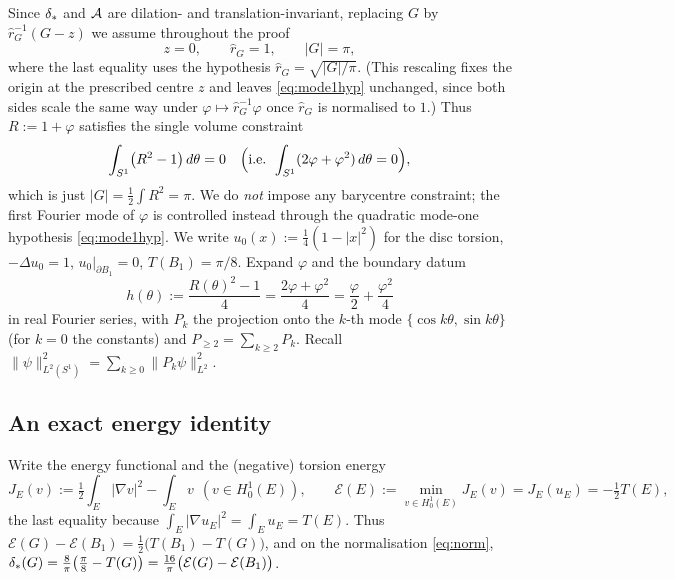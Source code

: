 Since $\delta_{*}$ and $\mathcal{A}$ are dilation- and translation-invariant, replacing
$G$ by $\hat r_G^{-1}(G-z)$ we assume throughout the proof
\begin{equation}\label{eq:norm}
   z=0,\qquad \hat r_G=1,\qquad |G|=\pi,
\end{equation}
where the last equality uses the hypothesis
$\hat r_G=\sqrt{|G|/\pi}$. (This rescaling fixes the origin at the prescribed
centre $z$ and leaves \eqref{eq:mode1hyp} unchanged, since both sides scale
the same way under $\varphi\mapsto\hat r_G^{-1}\varphi$ once $\hat r_G$ is
normalised to $1$.) Thus $R:=1+\varphi$ satisfies the single volume
constraint
\begin{equation}\label{eq:constraints}
   \int_{S^1}\bigl(R^2-1\bigr)\,d\theta=0
   \quad\Bigl(\text{i.e. }\int_{S^1}(2\varphi+\varphi^2)\,d\theta=0\Bigr),
\end{equation}
which is just $|G|=\tfrac12\int R^2=\pi$. We do \emph{not} impose any
barycentre constraint; the first Fourier mode of $\varphi$ is controlled
instead through the quadratic mode-one hypothesis \eqref{eq:mode1hyp}. We
write $u_0(x):=\tfrac14(1-|x|^2)$
for the disc torsion, $-\Delta u_0=1$, $u_0|_{\partial B_1}=0$,
$T(B_1)=\pi/8$. Expand $\varphi$ and the boundary datum
\begin{equation}\label{eq:hdef}
   h(\theta):=\frac{R(\theta)^2-1}{4}=\frac{2\varphi+\varphi^2}{4}
   =\frac\varphi2+\frac{\varphi^2}4
\end{equation}
in real Fourier series, with $P_k$ the projection onto the $k$-th mode
$\{\cos k\theta,\sin k\theta\}$ (for $k=0$ the constants) and
$P_{\ge2}=\sum_{k\ge2}P_k$. Recall $\|\psi\|_{L^2(S^1)}^2=\sum_{k\ge0}
\|P_k\psi\|_{L^2}^2$.

\subsection{An exact energy identity}

Write the energy functional and the (negative) torsion energy
\begin{equation}\label{eq:Jdef}
   J_E(v):=\tfrac12\int_E|\nabla v|^2-\int_E v\ \ (v\in H^1_0(E)),
   \qquad
   \mathcal E(E):=\min_{v\in H^1_0(E)}J_E(v)=J_E(u_E)=-\tfrac12 T(E),
\end{equation}
the last equality because $\int_E|\nabla u_E|^2=\int_E u_E=T(E)$. Thus
$\mathcal E(G)-\mathcal E(B_1)=\tfrac12\bigl(T(B_1)-T(G)\bigr)$, and on the
normalisation \eqref{eq:norm},
$\delta_{*}(G)=\tfrac8\pi\bigl(\tfrac\pi8-T(G)\bigr)
=\tfrac{16}\pi\bigl(\mathcal E(G)-\mathcal E(B_1)\bigr)$.


